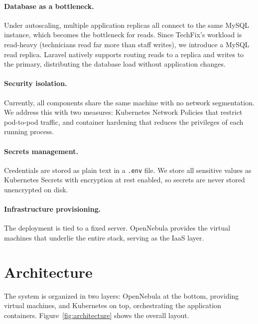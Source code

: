 \documentclass[12pt,a4paper]{article}
\begin{document}
\paragraph{Database as a bottleneck.} Under autoscaling, multiple application replicas all connect to the same MySQL instance, which becomes the bottleneck for reads. Since TechFix's workload is read-heavy (technicians read far more than staff writes), we introduce a MySQL read replica. Laravel natively supports routing reads to a replica and writes to the primary, distributing the database load without application changes.

\paragraph{Security isolation.} Currently, all components share the same machine with no network segmentation. We address this with two measures: Kubernetes Network Policies that restrict pod-to-pod traffic, and container hardening that reduces the privileges of each running process.

\paragraph{Secrets management.} Credentials are stored as plain text in a \texttt{.env} file. We store all sensitive values as Kubernetes Secrets with encryption at rest enabled, so secrets are never stored unencrypted on disk.

\paragraph{Infrastructure provisioning.} The deployment is tied to a fixed server. OpenNebula provides the virtual machines that underlie the entire stack, serving as the IaaS layer.

\section{Architecture}

The system is organized in two layers: OpenNebula at the bottom, providing virtual machines, and Kubernetes on top, orchestrating the application containers. Figure~\ref{fig:architecture} shows the overall layout.
\end{document}
